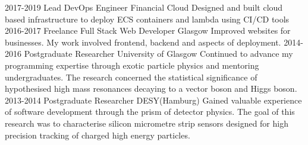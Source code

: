 \documentclass[]{twentysecondcv}
\begin{document}
\begin{twenty}
  \twentyitem
  {2017-2019}
  {Lead DevOps Engineer}
  {Financial Cloud}
  {Designed and built cloud based infrastructure to deploy ECS containers and lambda using CI/CD tools}
  \twentyitem
    {2016-2017}
    {Freelance Full Stack Web Developer}
    {Glasgow}
    {Improved websites for businesses. My work involved frontend, backend and aspects of deployment.}
  \twentyitem
    {2014-2016}
    {Postgraduate Researcher}
    {University of Glasgow}
    {Continued to advance my programming expertise through exotic particle physics and mentoring undergraduates.  The research concerned the  statistical significance of hypothesised high mass resonances decaying to a vector boson and Higgs boson.}
\twentyitem
    {2013-2014}
    {Postgraduate Researcher}
		{DESY(Hamburg)}
    {Gained valuable experience of software development through the prism of detector physics.  The goal of this research was to  characterise silicon micrometre strip sensors designed for high precision tracking of charged high energy particles.}

\end{twenty}

\end{document}
